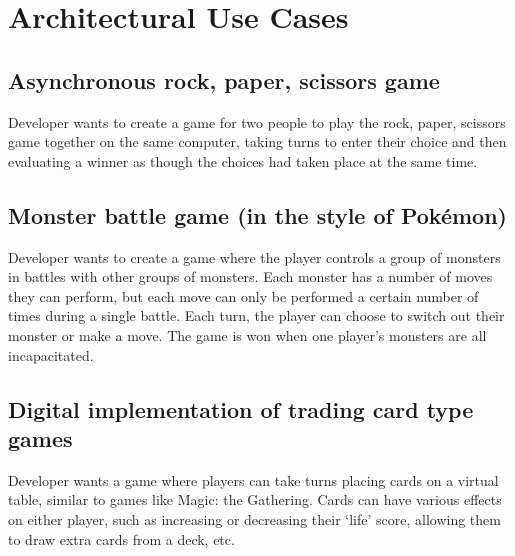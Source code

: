 \documentclass[11pt]{report}
\begin{document}
\section{Architectural Use Cases}
	\subsection{Asynchronous rock, paper, scissors game}
	Developer wants to create a game for two people to play the rock, paper, scissors game together on the same computer, taking turns to enter their choice and then evaluating a winner as though the choices had taken place at the same time. 
	\subsection{Monster battle game (in the style of Pok\'{e}mon\textregistered)}
	Developer wants to create a game where the player controls a group of monsters in battles with other groups of monsters. Each monster has a number of moves they can perform, but each move can only be performed a certain number of times during a single battle. Each turn, the player can choose to switch out their monster or make a move. The game is won when one player’s monsters are all incapacitated.
	\subsection{Digital implementation of trading card type games}
	Developer wants a game where players can take turns placing cards on a virtual table, similar to games like Magic: the Gathering. Cards can have various effects on either player, such as increasing or decreasing their ‘life’ score, allowing them to draw extra cards from a deck, etc.
\end{document}
